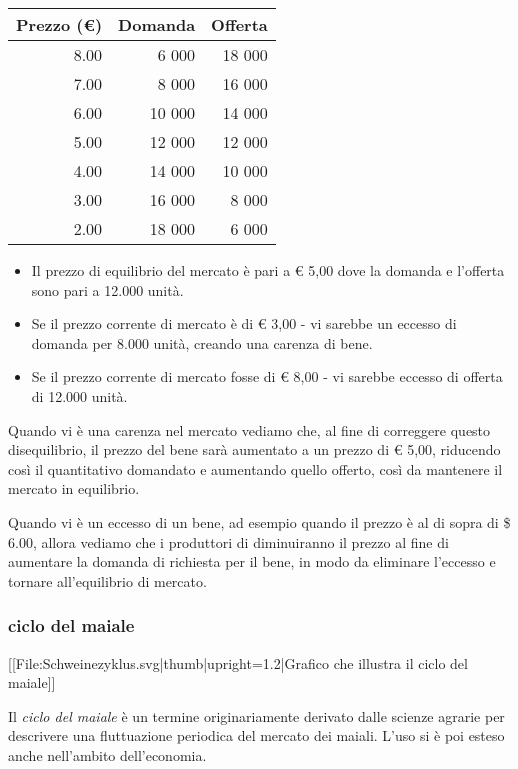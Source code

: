 \begin{center}
\begin{tabular}{rrr}
\toprule
Prezzo (€) & Domanda & Offerta\\
\midrule
8.00 & 6 000 & 18 000\\
7.00 & 8 000 & 16 000\\
6.00 & 10 000 & 14 000\\
5.00 & 12 000 & 12 000\\
4.00 & 14 000 & 10 000\\
3.00 & 16 000 & 8 000\\
2.00 & 18 000 & 6 000\\
\bottomrule
\end{tabular}
\end{center}

\begin{itemize} [noitemsep]
 \item Il prezzo di equilibrio del mercato è pari a € 5,00 dove la domanda e 
l'offerta sono pari a 12.000 unità.
 \item Se il prezzo corrente di mercato è di € 3,00 - vi sarebbe un eccesso di 
domanda per 8.000 unità, creando una carenza di bene.
 \item Se il prezzo corrente di mercato fosse di € 8,00 - vi sarebbe eccesso di 
offerta di 12.000 unità.
\end{itemize}

Quando vi è una carenza nel mercato vediamo che, al fine di correggere questo 
disequilibrio, il prezzo del bene sarà aumentato a un prezzo di € 5,00, 
riducendo così il quantitativo domandato e aumentando quello offerto, così da 
mantenere il mercato in equilibrio.

Quando vi è un eccesso di un bene, ad esempio quando il prezzo è al di sopra di 
\$ 6.00, allora vediamo che i produttori di diminuiranno il prezzo al fine di 
aumentare la domanda di richiesta per il bene, in modo da eliminare l'eccesso e 
tornare all'equilibrio di mercato. 

% 

\subsubsection{ciclo del maiale}

[[File:Schweinezyklus.svg|thumb|upright=1.2|Grafico che illustra il ciclo del 
maiale]] 

Il \emph{ciclo del maiale} è un termine originariamente derivato dalle 
scienze agrarie per descrivere una fluttuazione periodica del 
mercato dei maiali. L'uso si è poi esteso anche nell'ambito 
dell'economia.

